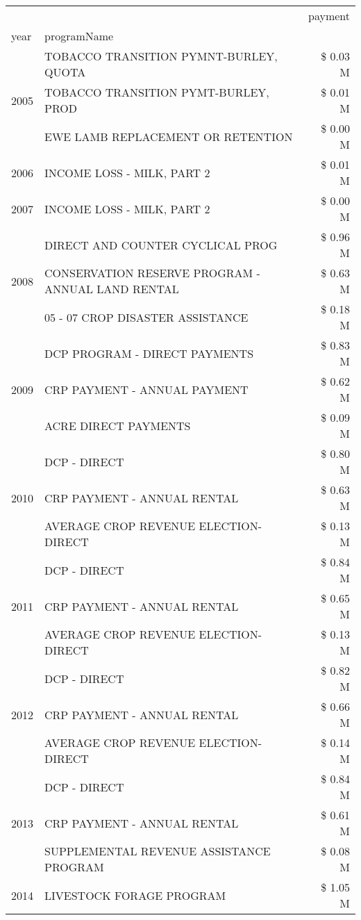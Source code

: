 \begin{tabular}{llr}
\toprule
 &  & payment \\
year & programName &  \\
\midrule
\multirow[t]{3}{*}{2005} & TOBACCO TRANSITION PYMNT-BURLEY, QUOTA & \$ 0.03 M \\
 & TOBACCO TRANSITION PYMT-BURLEY, PROD & \$ 0.01 M \\
 & EWE LAMB REPLACEMENT OR RETENTION & \$ 0.00 M \\
\cline{1-3}
2006 & INCOME LOSS - MILK, PART 2 & \$ 0.01 M \\
\cline{1-3}
2007 & INCOME LOSS - MILK, PART 2 & \$ 0.00 M \\
\cline{1-3}
\multirow[t]{3}{*}{2008} & DIRECT AND COUNTER CYCLICAL PROG & \$ 0.96 M \\
 & CONSERVATION RESERVE PROGRAM - ANNUAL LAND RENTAL & \$ 0.63 M \\
 & 05 - 07 CROP DISASTER ASSISTANCE & \$ 0.18 M \\
\cline{1-3}
\multirow[t]{3}{*}{2009} & DCP PROGRAM - DIRECT PAYMENTS & \$ 0.83 M \\
 & CRP PAYMENT - ANNUAL PAYMENT & \$ 0.62 M \\
 & ACRE DIRECT PAYMENTS & \$ 0.09 M \\
\cline{1-3}
\multirow[t]{3}{*}{2010} & DCP - DIRECT & \$ 0.80 M \\
 & CRP PAYMENT - ANNUAL RENTAL & \$ 0.63 M \\
 & AVERAGE CROP REVENUE ELECTION-DIRECT & \$ 0.13 M \\
\cline{1-3}
\multirow[t]{3}{*}{2011} & DCP - DIRECT & \$ 0.84 M \\
 & CRP PAYMENT - ANNUAL RENTAL & \$ 0.65 M \\
 & AVERAGE CROP REVENUE ELECTION-DIRECT & \$ 0.13 M \\
\cline{1-3}
\multirow[t]{3}{*}{2012} & DCP - DIRECT & \$ 0.82 M \\
 & CRP PAYMENT - ANNUAL RENTAL & \$ 0.66 M \\
 & AVERAGE CROP REVENUE ELECTION-DIRECT & \$ 0.14 M \\
\cline{1-3}
\multirow[t]{3}{*}{2013} & DCP - DIRECT & \$ 0.84 M \\
 & CRP PAYMENT - ANNUAL RENTAL & \$ 0.61 M \\
 & SUPPLEMENTAL REVENUE ASSISTANCE PROGRAM & \$ 0.08 M \\
\cline{1-3}
\multirow[t]{3}{*}{2014} & LIVESTOCK FORAGE PROGRAM & \$ 1.05 M \\

\end{tabular}
